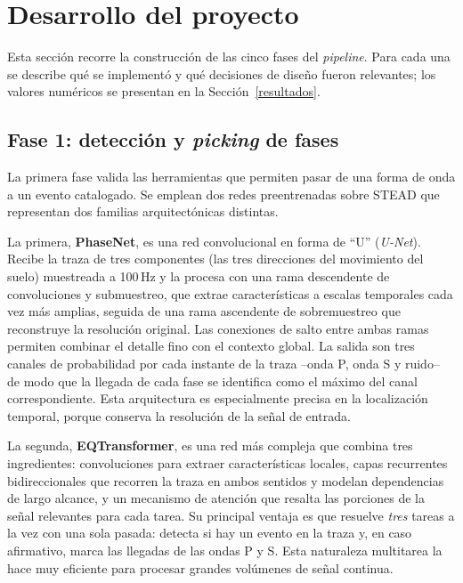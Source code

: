\section{Desarrollo del proyecto}
\label{desarrollo-del-proyecto}

Esta sección recorre la construcción de las cinco fases del \textit{pipeline}. Para cada una
se describe qué se implementó y qué decisiones de diseño fueron relevantes; los valores
numéricos se presentan en la Sección~\ref{resultados}.

\subsection{Fase 1: detección y \textit{picking} de fases}
\label{dev-deteccion}

La primera fase valida las herramientas que permiten pasar de una forma de onda a un evento
catalogado. Se emplean dos redes preentrenadas sobre STEAD que representan dos familias
arquitectónicas distintas.

La primera, \textbf{PhaseNet}, es una red convolucional en forma de ``U'' (\textit{U-Net}).
Recibe la traza de tres componentes (las tres direcciones del movimiento del suelo) muestreada
a 100\,Hz y la procesa con una rama descendente de convoluciones y submuestreo, que extrae
características a escalas temporales cada vez más amplias, seguida de una rama ascendente de
sobremuestreo que reconstruye la resolución original. Las conexiones de salto entre ambas ramas
permiten combinar el detalle fino con el contexto global. La salida son tres canales de
probabilidad por cada instante de la traza --onda P, onda S y ruido-- de modo que la llegada de
cada fase se identifica como el máximo del canal correspondiente. Esta arquitectura es
especialmente precisa en la localización temporal, porque conserva la resolución de la señal de
entrada.

La segunda, \textbf{EQTransformer}, es una red más compleja que combina tres ingredientes:
convoluciones para extraer características locales, capas recurrentes bidireccionales que
recorren la traza en ambos sentidos y modelan dependencias de largo alcance, y un mecanismo de
atención que resalta las porciones de la señal relevantes para cada tarea. Su principal ventaja
es que resuelve \emph{tres} tareas a la vez con una sola pasada: detecta si hay un evento en la
traza y, en caso afirmativo, marca las llegadas de las ondas P y S. Esta naturaleza multitarea
la hace muy eficiente para procesar grandes volúmenes de señal continua.

